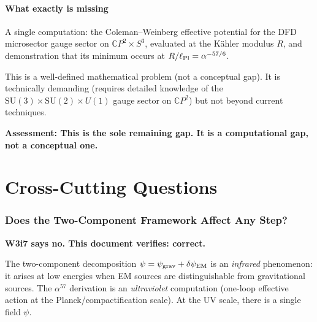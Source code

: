 \documentclass[11pt,a4paper]{article}
\newcommand{\CP}{\mathbb{C}P}
\newcommand{\alphafine}{\alpha}
\begin{document}
\subsection{What exactly is missing}

A single computation: the Coleman--Weinberg effective potential for the
DFD microsector gauge sector on $\CP^2 \times S^3$, evaluated at the
K\"ahler modulus $R$, and demonstration that its minimum occurs at
$R/\ell_{\rm Pl} = \alphafine^{-57/6}$.

This is a well-defined mathematical problem (not a conceptual gap).
It is technically demanding (requires detailed knowledge of the
$\mathrm{SU}(3) \times \mathrm{SU}(2) \times U(1)$ gauge sector on
$\CP^2$) but not beyond current techniques.

\textbf{Assessment: This is the sole remaining gap. It is a
computational gap, not a conceptual one.}

\part{Cross-Cutting Questions}
\label{part:cross}

\section{Does the Two-Component Framework Affect Any Step?}
\label{sec:two-component}

\textbf{W3i7 says no. This document verifies: correct.}

The two-component decomposition $\psi = \psi_{\rm grav} +
\delta\psi_{\rm EM}$ is an \emph{infrared} phenomenon: it arises at
low energies when EM sources are distinguishable from gravitational
sources. The $\alpha^{57}$ derivation is an \emph{ultraviolet}
computation (one-loop effective action at the Planck/compactification
scale). At the UV scale, there is a single field $\psi$.
\end{document}
